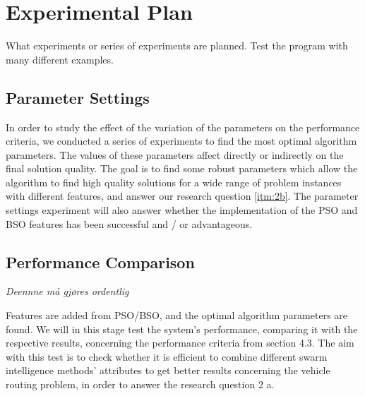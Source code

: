 \section{Experimental Plan}

What experiments or series of experiments are planned. Test the program with many different examples.



\subsection{Parameter Settings}
\label{subsec:parameterSettings_plan}

In order to study the effect of the variation of the parameters on the performance criteria, we conducted a series of experiments to find the most optimal algorithm parameters. The values of these parameters affect directly or indirectly on the final solution quality. The goal is to find some robust parameters which allow the algorithm to find high quality solutions for a wide range of problem instances with different features, and answer our research question \vref{itm:2b}. The parameter settings experiment will also answer whether the implementation of the PSO and BSO features has been successful and / or advantageous. 

\subsection{Performance Comparison}
\emph{\color{red}Deennne må gjøres ordentlig}

Features are added from PSO/BSO, and the optimal algorithm parameters are found. We will in this stage test the system's performance, comparing it with the respective results, concerning the performance criteria from section 4.3. %
The aim with this test is to check whether it is efficient to combine different swarm intelligence methods' attributes to get better results concerning the vehicle routing problem, in order to answer the research question 2 a.


